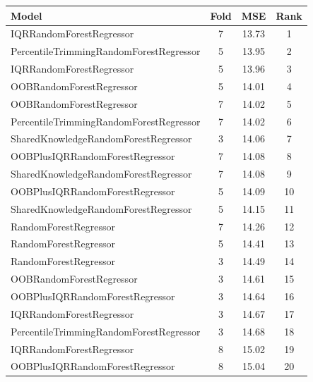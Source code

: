 \begin{table}[h]
\centering
\begin{tabular}{|l|c|c|c|}
\hline
Model & Fold & MSE & Rank \\ \hline
\textcolor[HTML]{27aeef}{IQRRandomForestRegressor} & 7 & 13.73 & 1 \\ \hline
\textcolor[HTML]{f46a9b}{PercentileTrimmingRandomForestRegressor} & 5 & 13.95 & 2 \\ \hline
\textcolor[HTML]{27aeef}{IQRRandomForestRegressor} & 5 & 13.96 & 3 \\ \hline
\textcolor[HTML]{b33dc6}{OOBRandomForestRegressor} & 5 & 14.01 & 4 \\ \hline
\textcolor[HTML]{b33dc6}{OOBRandomForestRegressor} & 7 & 14.02 & 5 \\ \hline
\textcolor[HTML]{f46a9b}{PercentileTrimmingRandomForestRegressor} & 7 & 14.02 & 6 \\ \hline
\textcolor[HTML]{ef9b20}{SharedKnowledgeRandomForestRegressor} & 3 & 14.06 & 7 \\ \hline
\textcolor[HTML]{ede15b}{OOBPlusIQRRandomForestRegressor} & 7 & 14.08 & 8 \\ \hline
\textcolor[HTML]{ef9b20}{SharedKnowledgeRandomForestRegressor} & 7 & 14.08 & 9 \\ \hline
\textcolor[HTML]{ede15b}{OOBPlusIQRRandomForestRegressor} & 5 & 14.09 & 10 \\ \hline
\textcolor[HTML]{ef9b20}{SharedKnowledgeRandomForestRegressor} & 5 & 14.15 & 11 \\ \hline
\textcolor[HTML]{87bc45}{RandomForestRegressor} & 7 & 14.26 & 12 \\ \hline
\textcolor[HTML]{87bc45}{RandomForestRegressor} & 5 & 14.41 & 13 \\ \hline
\textcolor[HTML]{87bc45}{RandomForestRegressor} & 3 & 14.49 & 14 \\ \hline
\textcolor[HTML]{b33dc6}{OOBRandomForestRegressor} & 3 & 14.61 & 15 \\ \hline
\textcolor[HTML]{ede15b}{OOBPlusIQRRandomForestRegressor} & 3 & 14.64 & 16 \\ \hline
\textcolor[HTML]{27aeef}{IQRRandomForestRegressor} & 3 & 14.67 & 17 \\ \hline
\textcolor[HTML]{f46a9b}{PercentileTrimmingRandomForestRegressor} & 3 & 14.68 & 18 \\ \hline
\textcolor[HTML]{27aeef}{IQRRandomForestRegressor} & 8 & 15.02 & 19 \\ \hline
\textcolor[HTML]{ede15b}{OOBPlusIQRRandomForestRegressor} & 8 & 15.04 & 20 \\ \hline

\end{tabular}
\end{table}
